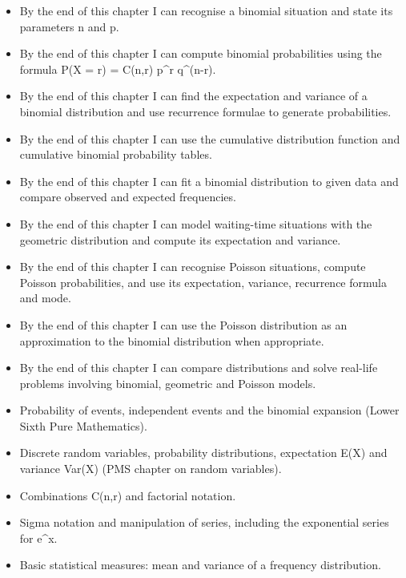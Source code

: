 \documentclass[11pt]{article}
\begin{document}
\begin{objectifs}
\begin{itemize}
\item By the end of this chapter I can recognise a binomial situation and state its parameters n and p.
\item By the end of this chapter I can compute binomial probabilities using the formula P(X = r) = C(n,r) p\^{}r q\^{}(n-r).
\item By the end of this chapter I can find the expectation and variance of a binomial distribution and use recurrence formulae to generate probabilities.
\item By the end of this chapter I can use the cumulative distribution function and cumulative binomial probability tables.
\item By the end of this chapter I can fit a binomial distribution to given data and compare observed and expected frequencies.
\item By the end of this chapter I can model waiting-time situations with the geometric distribution and compute its expectation and variance.
\item By the end of this chapter I can recognise Poisson situations, compute Poisson probabilities, and use its expectation, variance, recurrence formula and mode.
\item By the end of this chapter I can use the Poisson distribution as an approximation to the binomial distribution when appropriate.
\item By the end of this chapter I can compare distributions and solve real-life problems involving binomial, geometric and Poisson models.
\end{itemize}
\end{objectifs}

\begin{prerequis}
\begin{itemize}
\item Probability of events, independent events and the binomial expansion (Lower Sixth Pure Mathematics).
\item Discrete random variables, probability distributions, expectation E(X) and variance Var(X) (PMS chapter on random variables).
\item Combinations C(n,r) and factorial notation.
\item Sigma notation and manipulation of series, including the exponential series for e\^{}x.
\item Basic statistical measures: mean and variance of a frequency distribution.
\end{itemize}
\end{prerequis}
\end{document}
